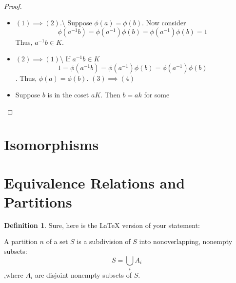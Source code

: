 \documentclass[
]{book}
\providecommand{\tightlist}{%
  \setlength{\itemsep}{0pt}\setlength{\parskip}{0pt}}
\theoremstyle{definition}
\newtheorem{definition}{Definition}[chapter]
\theoremstyle{definition}
\theoremstyle{definition}
\theoremstyle{definition}
\theoremstyle{remark}
\begin{document}
\begin{proof}
\leavevmode

\begin{itemize}
\tightlist
\item
  \((1)\implies (2)\).\textbackslash{}
  Suppose \(\phi(a) = \phi(b)\). Now consider
  \[\phi(a^{-1}b)=\phi(a^{-1})\phi(b)=\phi(a^{-1} )\phi(b)=1\]
  Thus, \(a^{-1}b\in K\).
\item
  \((2)\implies (1)\)\textbackslash{} If \(a^{-1}b \in K\)
  \[1=\phi(a^{-1}b)=\phi(a^{-1})\phi(b)=\phi(a^{-1} )\phi(b)\].
  Thus, \(\phi(a)=\phi(b)\).
  \((3) \implies (4)\)
\item
  Suppose \(b\) is in the coset \(aK\). Then \(b=ak\) for some
\end{itemize}

\end{proof}

\hypertarget{isomorphisms}{%
\section{Isomorphisms}\label{isomorphisms}}

\hypertarget{equivalence-relations-and-partitions}{%
\section{Equivalence Relations and Partitions}\label{equivalence-relations-and-partitions}}

\begin{definition}
\protect\hypertarget{def:unnamed-chunk-20}{}\label{def:unnamed-chunk-20}Sure, here is the LaTeX version of your statement:

A partition \(n\) of a set \(S\) is a subdivision of \(S\) into nonoverlapping, nonempty subsets:
\[S = \bigcup_{i} A_i\]
,where \(A_i\) are disjoint nonempty subsets of \(S\).
\end{definition}
\end{document}
